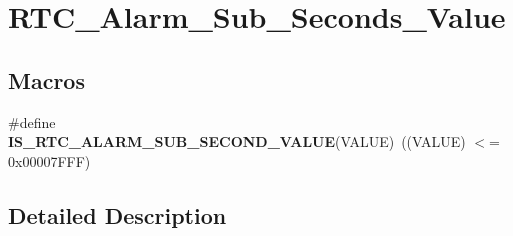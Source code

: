 \hypertarget{group___r_t_c___alarm___sub___seconds___value}{}\section{R\+T\+C\+\_\+\+Alarm\+\_\+\+Sub\+\_\+\+Seconds\+\_\+\+Value}
\label{group___r_t_c___alarm___sub___seconds___value}
\subsection*{Macros}
\begin{DoxyCompactItemize}
\item 
\hypertarget{group___r_t_c___alarm___sub___seconds___value_gae7cd07c18cdb2946a2b06f6606ede93c}{}\#define {\bfseries I\+S\+\_\+\+R\+T\+C\+\_\+\+A\+L\+A\+R\+M\+\_\+\+S\+U\+B\+\_\+\+S\+E\+C\+O\+N\+D\+\_\+\+V\+A\+L\+U\+E}(V\+A\+L\+U\+E)~((V\+A\+L\+U\+E) $<$= 0x00007\+F\+F\+F)\label{group___r_t_c___alarm___sub___seconds___value_gae7cd07c18cdb2946a2b06f6606ede93c}

\end{DoxyCompactItemize}


\subsection{Detailed Description}
